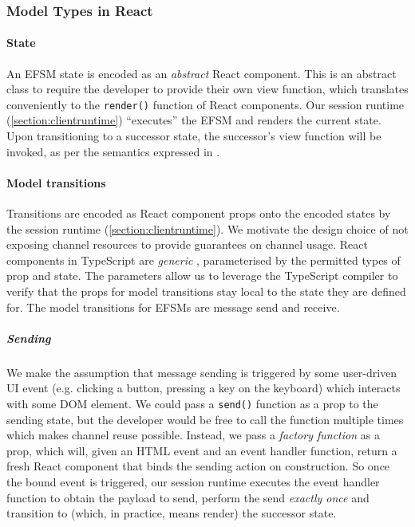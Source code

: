 \subsubsection{Model Types in React}

\paragraph{State}
An EFSM state is encoded as an \textit{abstract} React
component.
This is an abstract class to require the developer to provide their
own view function, which translates conveniently to the \texttt{render()}
function of React components.
Our session runtime (\cref{section:clientruntime}) ``executes'' the EFSM and
renders the current state.
Upon transitioning to a successor state, the successor's view function will be
invoked, as per the semantics expressed in \cite{MVU2019}.

\paragraph{Model transitions}
Transitions are encoded as React component props onto the encoded states by the
session runtime (\cref{section:clientruntime}).
We motivate the design choice of not exposing channel resources to provide
guarantees on channel usage.
React components in TypeScript are
\textit{generic} \cite{TypeScriptSpec}, parameterised by the permitted
types of prop and state.
The parameters allow us to leverage the TypeScript compiler to
verify that the props for model transitions stay local to the state they are
defined for.
The model transitions for EFSMs are message send and receive.

\subparagraph{Sending}
We make the assumption that message sending is triggered by
some user-driven UI event (e.g. clicking a button, pressing a key on the
keyboard) which interacts with some DOM element.
We could pass a
\texttt{send()} function as a prop to the sending state, but the developer
would be free to call the function multiple times which makes channel reuse
possible.
Instead, we pass a \textit{factory function} as a prop, which will,
given an HTML event and an event handler function, return a fresh React
component that binds the sending action on construction.
So once the bound event is triggered, our session runtime executes the event
handler function to obtain the payload to send, perform the send
\textit{exactly once} and transition to (which, in practice, means render) the
successor state.

